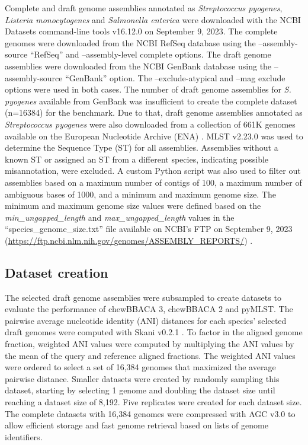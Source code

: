 Complete and draft genome assemblies annotated as \textit{Streptococcus pyogenes}, \textit{Listeria monocytogenes} and \textit{Salmonella enterica} were downloaded with the NCBI Datasets command-line tools v16.12.0 \citep{oleary_exploring_2024} on September 9, 2023. The complete genomes were downloaded from the NCBI RefSeq database \citep{sayers_database_2022} using the –assembly-source “RefSeq” and –assembly-level complete options. The draft genome assemblies were downloaded from the NCBI GenBank database \citep{sayers_database_2022} using the –assembly-source “GenBank” option. The –exclude-atypical and –mag exclude options were used in both cases. The number of draft genome assemblies for \textit{S. pyogenes} available from GenBank was insufficient to create the complete dataset (n=16384) for the benchmark. Due to that, draft genome assemblies annotated as \textit{Streptococcus pyogenes} were also downloaded from a collection of 661K genomes available on the European Nucleotide Archive (ENA) \citep{blackwell_exploring_2021}. MLST v2.23.0 \citep{jolley_bigsdb_2010, seemann_mlst_nodate} was used to determine the Sequence Type (ST) for all assemblies. Assemblies without a known ST or assigned an ST from a different species, indicating possible misannotation, were excluded. A custom Python script was also used to filter out assemblies based on a maximum number of contigs of 100, a maximum number of ambiguous bases of 1000, and a minimum and maximum genome size. The minimum and maximum genome size values were defined based on the \textit{min\_ungapped\_length} and \textit{max\_ungapped\_length} values in the “species\_genome\_size.txt” file available on NCBI’s FTP on September 9, 2023 (\url{https://ftp.ncbi.nlm.nih.gov/genomes/ASSEMBLY_REPORTS/}) \citep{sayers_database_2022}.

\subsection{Dataset creation} \label{ssec:methods_ssec2}

The selected draft genome assemblies were subsampled to create datasets to evaluate the performance of chewBBACA 3, chewBBACA 2 and pyMLST. The pairwise average nucleotide identity (ANI) distances for each species’ selected draft genomes were computed with Skani v0.2.1 \citep{shaw_fast_2023}. To factor in the aligned genome fraction, weighted ANI values were computed by multiplying the ANI values by the mean of the query and reference aligned fractions. The weighted ANI values were ordered to select a set of 16,384 genomes that maximized the average pairwise distance. Smaller datasets were created by randomly sampling this dataset, starting by selecting 1 genome and doubling the dataset size until reaching a dataset size of 8,192. Five replicates were created for each dataset size. The complete datasets with 16,384 genomes were compressed with AGC v3.0 \citep{deorowicz_agc_2023} to allow efficient storage and fast genome retrieval based on lists of genome identifiers.

